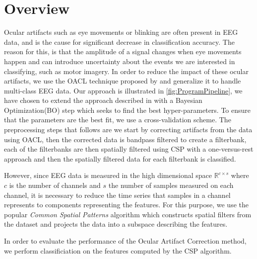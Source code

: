 \section{Overview}
Ocular artifacts such as eye movements or blinking are often present in EEG data, and is the cause for significant decrease in classification accuracy. The reason for this, is that the amplitude of a signal changes when eye movements happen and can introduce uncertainty about the events we are interested in classifying, such as motor imagery. In order to reduce the impact of these ocular artifacts, we use the OACL technique proposed by \citet{li2015ocular} and generalize it to handle multi-class EEG data. Our approach is illustrated in \cref{fig:ProgramPipeline}, we have chosen to extend the approach described in \citet{li2015ocular} with a Bayesian Optimization(BO) step which seeks to find the best hyper-parameters. To ensure that the parameters are the best fit, we use a cross-validation scheme. The preprocessing steps that follows are we start by correcting artifacts from the data using OACL, then the corrected data is bandpass filtered to create a filterbank, each of the filterbanks are then spatially filtered using CSP with a one-versus-rest approach and then the spatially filtered data for each filterbank is classified.

However, since EEG data is measured in the high dimensional space $\mathbb{R}^{c \times s}$ where $c$ is the number of channels and $s$ the number of samples measured on each channel, it is necessary to reduce the time series that samples in a channel represents to components representing the features. For this purpose, we use the popular \emph{Common Spatial Patterns} algorithm which constructs spatial filters from the dataset and projects the data into a subspace describing the features.

In order to evaluate the performance of the Ocular Artifact Correction method, we perform classificiation on the features computed by the CSP algorithm.
